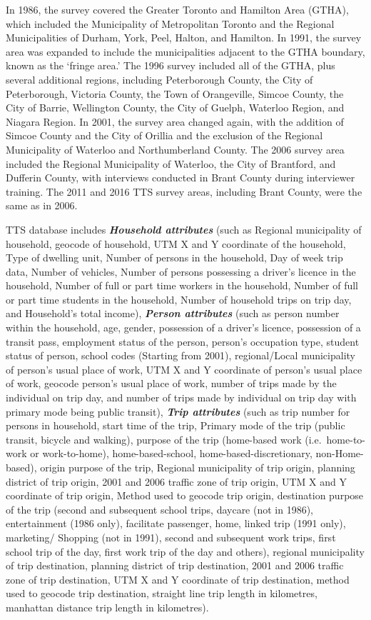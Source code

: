 \documentclass[
11pt, %
oneside, %
english, %
singlespacing, %
]{macthesis} %
\begin{document}
In 1986, the survey covered the Greater Toronto and Hamilton Area (GTHA), which included the Municipality of Metropolitan Toronto and the Regional Municipalities of Durham, York, Peel, Halton, and Hamilton. In 1991, the survey area was expanded to include the municipalities adjacent to the GTHA boundary, known as the `fringe area.' The 1996 survey included all of the GTHA, plus several additional regions, including Peterborough County, the City of Peterborough, Victoria County, the Town of Orangeville, Simcoe County, the City of Barrie, Wellington County, the City of Guelph, Waterloo Region, and Niagara Region. In 2001, the survey area changed again, with the addition of Simcoe County and the City of Orillia and the exclusion of the Regional Municipality of Waterloo and Northumberland County. The 2006 survey area included the Regional Municipality of Waterloo, the City of Brantford, and Dufferin County, with interviews conducted in Brant County during interviewer training. The 2011 and 2016 TTS survey areas, including Brant County, were the same as in 2006.

TTS database includes \textbf{\emph{Household attributes}} (such as Regional municipality of household, geocode of household, UTM X and Y coordinate of the household, Type of dwelling unit, Number of persons in the household, Day of week trip data, Number of vehicles, Number of persons possessing a driver's licence in the household, Number of full or part time workers in the household, Number of full or part time students in the household, Number of household trips on trip day, and Household's total income), \textbf{\emph{Person attributes}} (such as person number within the household, age, gender, possession of a driver's licence, possession of a transit pass, employment status of the person, person's occupation type, student status of person, school codes (Starting from 2001), regional/Local municipality of person's usual place of work, UTM X and Y coordinate of person's usual place of work, geocode person's usual place of work, number of trips made by the individual on trip day, and number of trips made by individual on trip day with primary mode being public transit), \textbf{\emph{Trip attributes}} (such as trip number for persons in household, start time of the trip, Primary mode of the trip (public transit, bicycle and walking), purpose of the trip (home-based work (i.e.~home-to-work or work-to-home), home-based-school, home-based-discretionary, non-Home-based), origin purpose of the trip, Regional municipality of trip origin, planning district of trip origin, 2001 and 2006 traffic zone of trip origin, UTM X and Y coordinate of trip origin, Method used to geocode trip origin, destination purpose of the trip (second and subsequent school trips, daycare (not in 1986), entertainment (1986 only), facilitate passenger, home, linked trip (1991 only), marketing/ Shopping (not in 1991), second and subsequent work trips, first school trip of the day, first work trip of the day and others), regional municipality of trip destination, planning district of trip destination, 2001 and 2006 traffic zone of trip destination, UTM X and Y coordinate of trip destination, method used to geocode trip destination, straight line trip length in kilometres, manhattan distance trip length in kilometres).
\end{document}

